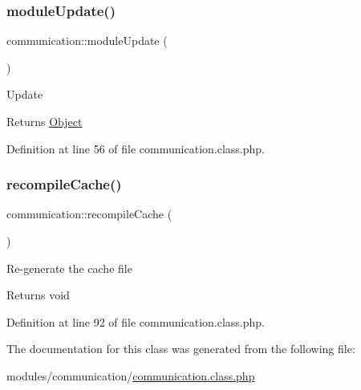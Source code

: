 \subsubsection{\texorpdfstring{module\+Update()}{moduleUpdate()}}
{\footnotesize\ttfamily communication\+::module\+Update (\begin{DoxyParamCaption}{ }\end{DoxyParamCaption})}

Update \begin{DoxyReturn}{Returns}
\hyperlink{classObject}{Object} 
\end{DoxyReturn}


Definition at line 56 of file communication.\+class.\+php.

\hypertarget{classcommunication_a79303a25f2f20a3bdd40f6af4b8f9a52}{}\label{classcommunication_a79303a25f2f20a3bdd40f6af4b8f9a52} 
\subsubsection{\texorpdfstring{recompile\+Cache()}{recompileCache()}}
{\footnotesize\ttfamily communication\+::recompile\+Cache (\begin{DoxyParamCaption}{ }\end{DoxyParamCaption})}

Re-\/generate the cache file \begin{DoxyReturn}{Returns}
void 
\end{DoxyReturn}


Definition at line 92 of file communication.\+class.\+php.



The documentation for this class was generated from the following file\+:\begin{DoxyCompactItemize}
\item 
modules/communication/\hyperlink{communication_8class_8php}{communication.\+class.\+php}\end{DoxyCompactItemize}
